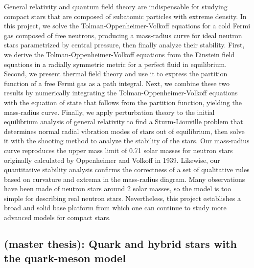 General relativity and quantum field theory are indispensable for studying compact stars
that are composed of subatomic particles with extreme density.
In this project, we solve the Tolman-Oppenheimer-Volkoff equations for a cold Fermi gas composed of free neutrons,
producing a mass-radius curve for ideal neutron stars parametrized by central pressure, then finally analyze their stability.
First, we derive the Tolman-Oppenheimer-Volkoff equations from the Einstein field equations
in a radially symmetric metric for a perfect fluid in equilibrium.
Second, we present thermal field theory and use it
to express the partition function of a free Fermi gas as a path integral.
Next, we combine these two results by numerically integrating the Tolman-Oppenheimer-Volkoff equations
with the equation of state that follows from the partition function, yielding the mass-radius curve.
Finally, we apply perturbation theory to the initial equilibrium analysis of general relativity
to find a Sturm-Liouville problem that determines normal radial vibration modes of stars out of equilibrium,
then solve it with the shooting method to analyze the stability of the stars.
Our mass-radius curve reproduces the upper mass limit of 0.71 solar masses
for neutron stars originally calculated by Oppenheimer and Volkoff in 1939.
Likewise, our quantitative stability analysis confirms the correctness
of a set of qualitative rules based on curvature and extrema in the mass-radius diagram.
Many observations have been made of neutron stars around 2 solar masses,
so the model is too simple for describing real neutron stars.
Nevertheless, this project establishes a broad and solid base platform
from which one can continue to study more advanced models for compact stars.


\subsection*{ (master thesis): Quark and hybrid stars with the quark-meson model}

